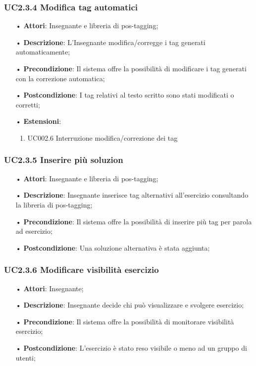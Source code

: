 \subsubsection{UC2.3.4	Modifica tag automatici}
\begin{itemize}
	\item[•] \textbf{Attori}: Insegnante e libreria di pos-tagging;
	\item[•] \textbf{Descrizione}: L’Insegnante modifica/corregge i tag generati automaticamente;
	\item[•] \textbf{Precondizione}: Il sistema offre la possibilità di modificare i tag generati con la correzione automatica;
	\item[•] \textbf{Postcondizione}: I tag relativi al testo scritto sono stati modificati o corretti;
	\item[•] \textbf{Estensioni}:
	\begin{enumerate}
		\item UC002.6 Interruzione modifica/correzione dei tag
	
	\end{enumerate}
\end{itemize}

\subsubsection{UC2.3.5	Inserire più soluzion}
\begin{itemize}
	\item[•] \textbf{Attori}: Insegnante e libreria di pos-tagging;
	\item[•] \textbf{Descrizione}: Insegnante inserisce tag alternativi all’esercizio consultando la libreria di pos-tagging;
	\item[•] \textbf{Precondizione}: Il sistema offre la possibilità di inserire più tag per parola ad 
			esercizio;
	\item[•] \textbf{Postcondizione}: Una soluzione alternativa è stata aggiunta;
\end{itemize}

\subsubsection{UC2.3.6	Modificare visibilità esercizio}
\begin{itemize}
	\item[•] \textbf{Attori}: Insegnante;
	\item[•] \textbf{Descrizione}: Insegnante decide chi può visualizzare e svolgere esercizio;
	\item[•] \textbf{Precondizione}: Il sistema offre la possibilità di monitorare visibilità esercizio;
	\item[•] \textbf{Postcondizione}: L’esercizio è stato reso visibile o meno ad un gruppo di utenti;	
\end{itemize}

